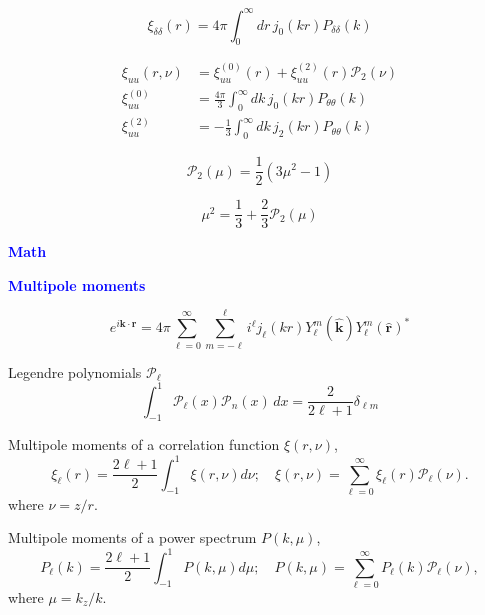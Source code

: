 \documentclass[a4paper,11pt, fleqn]{article}
\begin{document}
\begin{equation}
  \xi_{\delta\delta}(r) = 4\pi \int_0^\infty \! dr\,
  j_0(kr) P_{\delta\delta}(k)
\end{equation}

\begin{align}
  \xi_{uu}(r, \nu) &= \xi_{uu}^{(0)}(r) + \xi_{uu}^{(2)}(r) \mathcal{P}_2(\nu)\\
  \xi_{uu}^{(0)} &= \frac{4\pi}{3} \int_0^\infty \!dk\,
                   j_0(kr) P_{\theta\theta}(k)\\
  \xi_{uu}^{(2)} &= -\frac{1}{3} \int_0^\infty \! dk\,
                   j_2(kr) P_{\theta\theta}(k)
\end{align}
  
\newpage
\begin{equation}
  \mathcal{P}_2(\mu) = \frac{1}{2}\left( 3 \mu^2 - 1 \right)
\end{equation}

\begin{equation}
  \mu^2 = \frac{1}{3} + \frac{2}{3} \mathcal{P}_2(\mu)
\end{equation}


\newpage
{\Huge \textbf{\textcolor{Blue}{Math}}}
    
\vspace{2mm}
{\Large \textbf{\textcolor{Blue}{Multipole moments}}}    
\vspace{5mm}

\begin{equation}
  e^{i\bm{k}\cdot\bm{r}} = 4\pi \sum_{\ell=0}^\infty \sum_{m=-\ell}^\ell
  i^\ell j_\ell(kr) Y_\ell^m(\hat{\bm{k}}) Y_\ell^m(\hat{\bm{r}})^*
\end{equation}

Legendre polynomials $\mathcal{P}_\ell$
\begin{equation}
  \int_{-1}^1 \mathcal{P}_\ell(x) \mathcal{P}_n(x) \, dx =
    \frac{2}{2\ell + 1} \delta_{\ell m}
\end{equation}

Multipole moments of a correlation function $\xi(r,\nu)$,
\begin{equation}
  \xi_\ell(r) = \frac{2 \ell + 1}{2} \int_{-1}^1 \xi(r, \nu) d\nu;\quad
  \xi(r, \nu) = \sum_{\ell=0}^\infty \xi_\ell(r) \mathcal{P}_\ell(\nu).
\end{equation}
where $\nu = z/r$.

Multipole moments of a power spectrum $P(k, \mu)$,
\begin{equation}
  P_\ell(k) = \frac{2 \ell + 1}{2} \int_{-1}^1 P(k, \mu) d\mu;\quad
  P(k, \mu) = \sum_{\ell=0}^\infty P_\ell(k) \mathcal{P}_\ell(\nu),
\end{equation}
where $\mu = k_z/k$.
\end{document}
